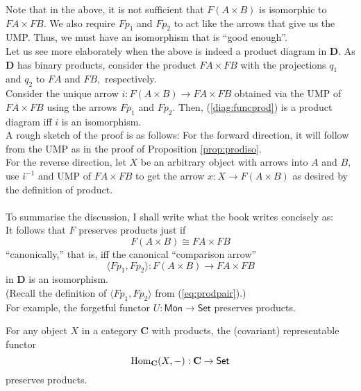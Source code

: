 Note that in the above, it is not sufficient that $F(A \times B)$ is isomorphic to $FA \times FB.$ We also require $Fp_1$ and $Fp_2$ to act like the arrows that give us the UMP. Thus, we must have an isomorphism that is ``good enough''.\\
Let us see more elaborately when the above is indeed a product diagram in $\mathbf{D}.$ As $\mathbf{D}$ has binary products, consider the product $FA \times FB$ with the projections $q_1$ and $q_2$ to $FA$ and $FB,$ respectively.\\
Consider the unique arrow $i:F(A\times B) \to FA \times FB$ obtained via the UMP of $FA \times FB$ using the arrows $Fp_1$ and $Fp_2.$ Then, (\ref{diag:funcprod}) is a product diagram iff $i$ is an isomorphism.\\
A rough sketch of the proof is as follows: For the forward direction, it will follow from the UMP as in the proof of Proposition \ref{prop:prodiso}.\\
For the reverse direction, let $X$ be an arbitrary object with arrows into $A$ and $B,$ use $i^{-1}$ and UMP of $FA \times FB$ to get the arrow $x:X\to F(A \times B)$ as desired by the definition of product.\\~\\
To summarise the discussion, I shall write what the book writes concisely as:\\
It follows that $F$ preserves products just if
\begin{equation*} 
	F(A\times B) \cong FA \times FB
\end{equation*}
``canonically,'' that is, iff the canonical ``comparison arrow''
\begin{equation*} 
	\langle Fp_1, Fp_2\rangle : F(A \times B) \to FA \times FB
\end{equation*}
in $\mathbf{D}$ is an isomorphism.\\
(Recall the definition of $\langle Fp_1, Fp_2\rangle$ from (\ref{eq:prodpair}).)\\
For example, the forgetful functor $U:\mathsf{Mon}\to\mathsf{Set}$ preserves products.
\begin{cor}
	For any object $X$ in a category $\mathbf{C}$ with products, the (covariant) representable functor
	\begin{equation*} 
		\operatorname{Hom}_{\mathbf{C}}(X, -) : \mathbf{C} \to \mathsf{Set}
	\end{equation*}
	preserves products.
\end{cor}
